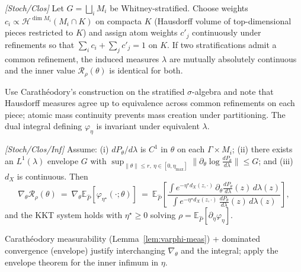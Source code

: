 \begin{proposition}\label{prop:lambda-refinement}
\emph{[\textup{Stoch/Clos}]}
Let $G=\bigsqcup_i M_i$ be Whitney-stratified. Choose weights $c_i \propto \mathcal H^{\dim M_i}(M_i\cap K)$ on compacta $K$ (Hausdorff volume of top-dimensional pieces restricted to $K$) and assign atom weights $c'_j$ continuously under refinements so that $\sum_i c_i+\sum_j c'_j=1$ on $K$. 
If two stratifications admit a common refinement, the induced measures $\lambda$ are mutually absolutely continuous and the inner value $\mathcal R_\rho(\theta)$ is identical for both. 
\begin{proofsketch}
Use Carath\'eodory's construction on the stratified $\sigma$-algebra and note that Hausdorff measures agree up to equivalence across common refinements on each piece; atomic mass continuity prevents mass creation under partitioning. The dual integral defining $\varphi_\eta$ is invariant under equivalent $\lambda$.
\end{proofsketch}
\end{proposition}

\begin{lemma}\label{lem:dv-kkt}
\emph{[\textup{Stoch/Clos/Inf}]}
Assume: (i) $dP_\theta/d\lambda$ is $C^1$ in $\theta$ on each $\Gamma\times M_i$; 
(ii) there exists an $L^1(\lambda)$ envelope $G$ with $\sup_{\|\theta\|\le r,\ \eta\in[0,\eta_{\max}]}\big\|\partial_\theta \log\frac{dP_\theta}{d\lambda}\big\|\le G$; and (iii) $d_X$ is continuous. Then
\[
\nabla_\theta \mathcal R_\rho(\theta)\ =\ \nabla_\theta \mathbb E_{\hat P}\!\left[\varphi_{\eta^\star}(\cdot;\theta)\right]
\ =\ \mathbb E_{\hat P}\!\left[\frac{\int e^{-\eta^\star d_X(z,\cdot)}\,\partial_\theta \frac{dP_\theta}{d\lambda}(z)\,d\lambda(z)}{\int e^{-\eta^\star d_X(z,\cdot)}\,\frac{dP_\theta}{d\lambda}(z)\,d\lambda(z)}\right],
\]
and the KKT system holds with $\eta^\star\ge 0$ solving $\rho=\mathbb E_{\hat P}[\partial_\eta \varphi_\eta]$. 
\begin{proofsketch}
Carath\'eodory measurability (Lemma~\ref{lem:varphi-meas}) + dominated convergence (envelope) justify interchanging $\nabla_\theta$ and the integral; apply the envelope theorem for the inner infimum in $\eta$.
\end{proofsketch}
\end{lemma}

